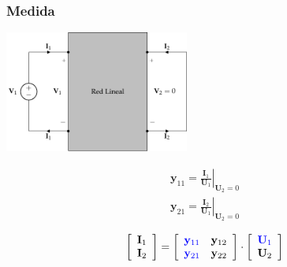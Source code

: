 \documentclass[10pt]{article}
\begin{document}
\subsubsection*{Medida}

\begin{minipage}{0.5\textwidth}
  \begin{center}
    \includegraphics[height=4cm]{../figs/parametrosY_entrada.pdf}
  \end{center}
\end{minipage}
\begin{minipage}{0.5\textwidth}
  \[
    \begin{array}{c}
      \mathbf{y}_{11} = \left.\frac{\mathbf{I}_1}{\mathbf{U}_1}\right\rvert_{\mathbf{U}_2 = 0} \\
      \mathbf{y}_{21} = \left.\frac{\mathbf{I}_2}{\mathbf{U}_1}\right\rvert_{\mathbf{U}_2 = 0}
    \end{array}
  \]

  \[
    \left[
      \begin{array}{c}
        \mathbf{I}_1\\
        \mathbf{I}_2
      \end{array}
    \right] =
    \left[
      \begin{array}{cc}
        \color{blue}{\mathbf{y}_{11}} & \mathbf{y}_{12}\\
        \color{blue}{\mathbf{y}_{21}} & \mathbf{y}_{22}
      \end{array}
    \right] \cdot
    \left[
      \begin{array}{c}
        \color{blue}{\mathbf{U}_1}\\
        \mathbf{U}_2
      \end{array}
    \right]
  \]
\end{minipage}

\vspace{1cm}
\end{document}
